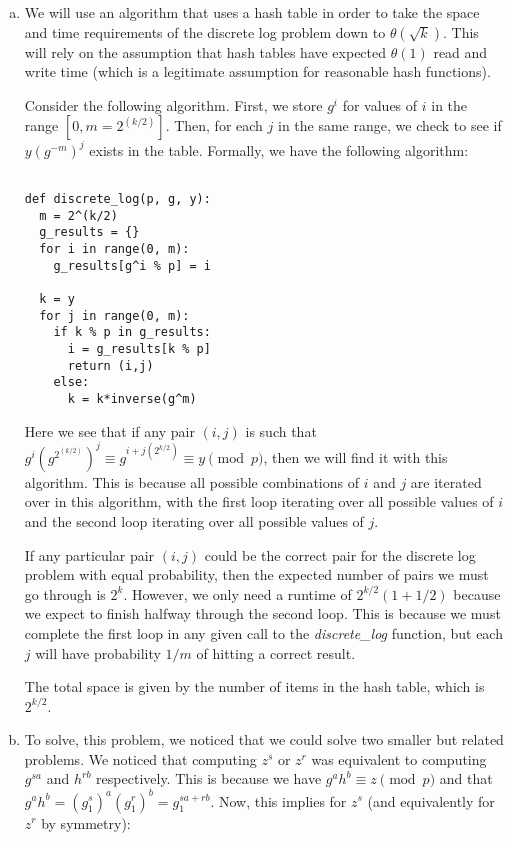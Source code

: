 
\begin{enumerate}[(a)]

  \item We will use an algorithm that uses a hash table in order to take the space and time requirements of the discrete log problem down to $\theta(\sqrt{k})$. This will rely on the assumption that hash tables have expected $\theta(1)$ read and write time (which is a legitimate assumption for reasonable hash functions).

Consider the following algorithm. First, we store $g^i$ for values of $i$ in the range $[0, m = 2^(k/2)]$. Then, for each $j$ in the same range, we check to see if $y (g^{-m})^j$ exists in the table. Formally, we have the following algorithm:

\begin{verbatim}

def discrete_log(p, g, y):
  m = 2^(k/2)
  g_results = {}
  for i in range(0, m):
    g_results[g^i % p] = i

  k = y
  for j in range(0, m):
    if k % p in g_results:
      i = g_results[k % p]
      return (i,j)
    else:
      k = k*inverse(g^m)
\end{verbatim}

Here we see that if any pair $(i,j)$ is such that $g^i (g^{2^(k/2)})^j \equiv g^{i + j (2^{k/2})} \equiv y \pmod{p}$, then we will find it with this algorithm. This is because all possible combinations of $i$ and $j$ are iterated over in this algorithm, with the first loop iterating over all possible values of $i$ and the second loop iterating over all possible values of $j$.

If any particular pair $(i,j)$ could be the correct pair for the discrete log problem with equal probability, then the expected number of pairs we must go through is $2^k$. However, we only need a runtime of $2^{k/2} (1 + 1/2)$ because we expect to finish halfway through the second loop. This is because we must complete the first loop in any given call to the \emph{discrete\_log} function, but each $j$ will have probability $1/m$ of hitting a correct result.

The total space is given by the number of items in the hash table, which is $2^{k/2}$.

  \item To solve, this problem, we noticed that we could solve two smaller but related problems. We noticed that computing $z^s$ or $z^r$ was equivalent to computing $g^{sa}$ and $h^{rb}$ respectively. This is because we have $g^a h^b \equiv z \pmod{p}$ and that $g^a h^b = (g_1^{s})^a (g_1^r)^b = g_1^{sa + rb}$. Now, this implies for $z^s$ (and equivalently for $z^r$ by symmetry):


\end{enumerate}
